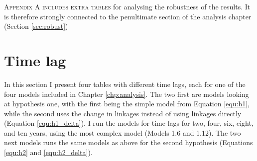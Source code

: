 \lettrine{A}{ppendix A includes extra tables} for analysing the robustness of the results. It is therefore strongly connected to the penultimate section of the analysis chapter (Section \ref{sec:robust})

\section{Time lag}
In this section I present four tables with different time lags, each for one of the four models included in Chapter \ref{chp:analysis}. The two first are models looking at hypothesis one, with the first being the simple model from Equation \ref{equ:h1}, while the second uses the change in linkages instead of using linkages directly (Equation \ref{equ:h1_delta}). I run the models for time lags for two, four, six, eight, and ten years, using the most complex model (Models 1.6 and 1.12). The two next models runs the same models as above for the second hypothesis (Equations \ref{equ:h2} and \ref{equ:h2_delta}). 

